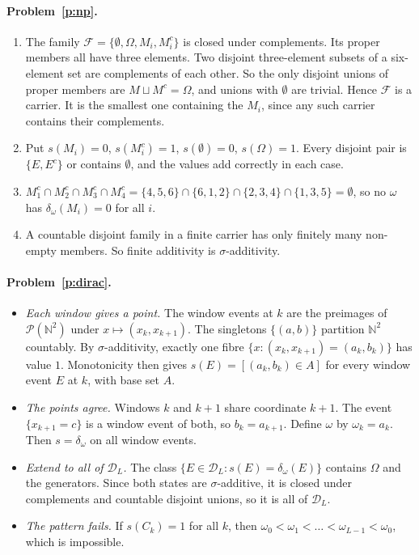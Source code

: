 \documentclass[11pt]{article}
\theoremstyle{definition}
\theoremstyle{remark}
\newcommand{\bbN}{\mathbb{N}}
\newcommand{\cD}{\mathcal{D}}
\begin{document}
\paragraph{Problem~\ref{p:np}.}
\begin{enumerate}[label=(\alph*)]
  \item The family $\mathcal F=\{\emptyset,\Omega,M_i,M_i^c\}$ is closed under
    complements. Its proper members all have three elements. Two disjoint
    three-element subsets of a six-element set are complements of each other.
    So the only disjoint unions of proper members are $M\sqcup M^c=\Omega$, and
    unions with $\emptyset$ are trivial. Hence $\mathcal F$ is a carrier. It is
    the smallest one containing the $M_i$, since any such carrier contains their
    complements.
  \item Put $s(M_i)=0$, $s(M_i^c)=1$, $s(\emptyset)=0$, $s(\Omega)=1$. Every
    disjoint pair is $\{E,E^c\}$ or contains $\emptyset$, and the values add
    correctly in each case.
  \item $M_1^c\cap M_2^c\cap M_3^c\cap M_4^c=\{4,5,6\}\cap\{6,1,2\}\cap\{2,3,4\}\cap\{1,3,5\}=\emptyset$,
    so no $\omega$ has $\delta_\omega(M_i)=0$ for all $i$.
  \item A countable disjoint family in a finite carrier has only finitely many
    non-empty members. So finite additivity is $\sigma$-additivity.
\end{enumerate}

\paragraph{Problem~\ref{p:dirac}.}
\begin{itemize}
  \item \emph{Each window gives a point.} The window events at $k$ are the
    preimages of $\mathcal P(\bbN^2)$ under $x\mapsto(x_k,x_{k+1})$. The
    singletons $\{(a,b)\}$ partition $\bbN^2$ countably. By
    $\sigma$-additivity, exactly one fibre $\{x:(x_k,x_{k+1})=(a_k,b_k)\}$ has
    value $1$. Monotonicity then gives $s(E)=[(a_k,b_k)\in A]$ for every window
    event $E$ at $k$, with base set $A$.
  \item \emph{The points agree.} Windows $k$ and $k{+}1$ share coordinate
    $k{+}1$. The event $\{x_{k+1}=c\}$ is a window event of both, so
    $b_k=a_{k+1}$. Define $\omega$ by $\omega_k=a_k$. Then $s=\delta_\omega$ on
    all window events.
  \item \emph{Extend to all of $\cD_L$.} The class
    $\{E\in\cD_L:s(E)=\delta_\omega(E)\}$ contains $\Omega$ and the generators.
    Since both states are $\sigma$-additive, it is closed under complements and
    countable disjoint unions, so it is all of $\cD_L$.
  \item \emph{The pattern fails.} If $s(C_k)=1$ for all $k$, then
    $\omega_0<\omega_1<\dots<\omega_{L-1}<\omega_0$, which is impossible.
\end{itemize}
\end{document}
